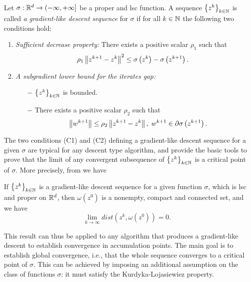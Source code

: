 \begin{definition}
	Let $\sigma: \mathbb{R}^d \rightarrow (-\infty, +\infty]$ be a proper and lsc function. A sequence $\left\lbrace z^k \right\rbrace_{k \in \mathbb{N}}$ is called \textit{a gradient-like descent sequence} for $\sigma$ if for all $k \in \mathbb{N}$ the following two conditions hold:
	\begin{enumerate}[(C1)]
		\item \textit{Sufficient decrease property:} There exists a positive scalar $\rho_1$ such that
		\begin{equation*}
			\rho_1 \left\Vert {z^{k+1} - z^k} \right\Vert^2 \leq \sigma\left( z^k \right) - \sigma \left( z^{k+1} \right) .
		\end{equation*}
		\item \textit{A subgradient lower bound for the iterates gap:}
		\begin{itemize}
			\item[$-$] $\left\lbrace z^k \right\rbrace_{k \in \mathbb{N}}$ is bounded.
			\item[$-$] There exists a positive scalar $\rho_2$ such that
			\begin{equation*}
				\left\Vert {w^{k+1}} \right\Vert \leq \rho_2 \left\Vert {z^{k+1} - z^k} \right\Vert, \; w^{k+1} \in \partial\sigma \left( z^{k+1}\right).
			\end{equation*}
		\end{itemize}
	\end{enumerate}
\end{definition}

The two conditions (C1) and (C2) defining a gradient-like descent sequence for a given $\sigma$ are typical for any descent type algorithm, and provide the basic tools to prove that the limit of any convergent subsequence of $\left\lbrace z^k \right\rbrace_{k \in \mathbb{N}}$ is a critical point of $\sigma$. More precisely, from \cite{BST2014} we have

\begin{lemma}
If $\left\lbrace z^k \right\rbrace_{k \in \mathbb{N}}$ is a gradient-like descent sequence for a given function $\sigma$, which is lsc and proper on $\mathbb{R}^d$, then $\omega\left(z^0\right)$ is a nonempty, compact and connected set, and we have
\begin{equation*}
	\lim_{k\rightarrow \infty} dist\left( z^k, \omega\left(z^0\right)\right) = 0.
\end{equation*}
\end{lemma}

This result can thus be applied to any algorithm that produces a gradient-like descent to establish convergence in accumulation points. The main goal is to establish global convergence, i.e., that the whole sequence converges to a critical point of $\sigma$. This can be achieved by imposing an additional assumption on the class of functions $\sigma$: it must satisfy the Kurdyka-{L}ojasiewiez property.

